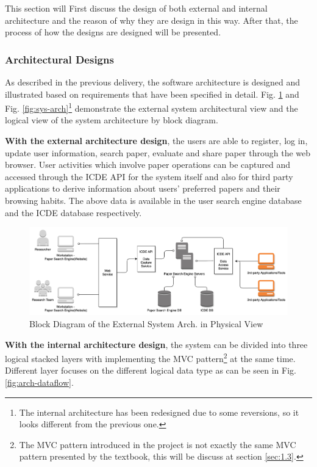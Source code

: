 \documentclass[conference]{IEEEtran}
\begin{document}
This section will First discuss the design of both external and internal architecture and the reason of why they are design in this way.
After that, the process of how the designs are designed will be presented.

\subsubsection{\textbf{Architectural Designs}}
\label{sec:1.1.1}

As described in the previous delivery, the software architecture is designed and illustrated based on requirements that have been specified in detail.
Fig. \ref{fig:sys-context} and  Fig. \ref{fig:sys-arch}\footnote{The internal architecture has been redesigned due to some reversions, so it looks different from the previous one.}
demonstrate the external system architectural view and the logical view of the system architecture by block diagram.

\textbf{With the external architecture design}, the users are able to register, log in, update user information, search paper, evaluate and share paper through the web browser.
User activities which involve paper operations can be captured and accessed through the ICDE API for the system itself
and also for third party applications to derive information about users' preferred papers and their browsing habits.
The above data is available in the user search engine database and the ICDE database respectively.

\begin{figure}[!ht]
	\centering
	\includegraphics[scale=0.06]{sys-context.png}
	\caption{Block Diagram of the External System Arch. in Physical View}
	\label{fig:sys-context}
\end{figure}

\textbf{With the internal architecture design}, the system can be divided into three logical stacked layers
with implementing the MVC pattern\footnote{The MVC pattern introduced in the project is not exactly the same MVC pattern presented by the textbook\cite{textbook}, this will be discuss at section \ref{sec:1.3}.} at the same time.
Different layer focuses on the different logical data type as can be seen in Fig. \ref{fig:arch-dataflow}.
\end{document}
